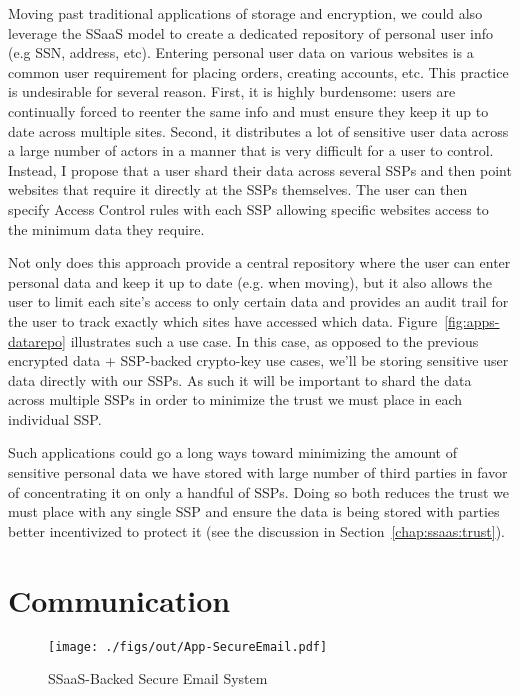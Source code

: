 Moving past traditional applications of storage and encryption, we
could also leverage the SSaaS model to create a dedicated repository
of personal user info (e.g SSN, address, etc). Entering personal user
data on various websites is a common user requirement for placing
orders, creating accounts, etc. This practice is undesirable for
several reason. First, it is highly burdensome: users are continually
forced to reenter the same info and must ensure they keep it up to
date across multiple sites. Second, it distributes a lot of sensitive
user data across a large number of actors in a manner that is very
difficult for a user to control. Instead, I propose that a user shard
their data across several SSPs and then point websites that require it
directly at the SSPs themselves. The user can then specify Access
Control rules with each SSP allowing specific websites access to the
minimum data they require.

Not only does this approach provide a central repository where the
user can enter personal data and keep it up to date (e.g. when
moving), but it also allows the user to limit each site's access to
only certain data and provides an audit trail for the user to track
exactly which sites have accessed which
data. Figure~\ref{fig:apps-datarepo} illustrates such a use case. In
this case, as opposed to the previous encrypted data + SSP-backed
crypto-key use cases, we'll be storing sensitive user data directly
with our SSPs. As such it will be important to shard the data across
multiple SSPs in order to minimize the trust we must place in each
individual SSP.

Such applications could go a long ways toward minimizing the amount of
sensitive personal data we have stored with large number of third
parties in favor of concentrating it on only a handful of SSPs. Doing
so both reduces the trust we must place with any single SSP and ensure
the data is being stored with parties better incentivized to protect
it (see the discussion in Section~\ref{chap:ssaas:trust}).

\section{Communication}

\begin{figure}[t]
  \centering
  \texttt{[image: ./figs/out/App-SecureEmail.pdf]}
  \caption{SSaaS-Backed Secure Email System}
  \label{fig:apps-secureemail}
\end{figure}

